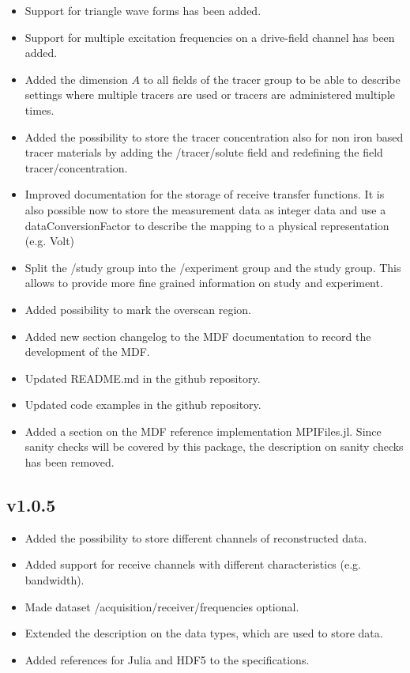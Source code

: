 \documentclass[landscape,a4paper]{article} %
\newcommand{\inlvar}[1]{{\ttfamily#1}}
\begin{document}
\begin{multicols}{2}
\begin{itemize}
	\item Support for triangle wave forms has been added.
	\item Support for multiple excitation frequencies on a drive-field channel has been added.
	\item Added the dimension $A$ to all fields of the \inlvar{tracer} group to be able to describe settings where multiple tracers are used or tracers are administered multiple times.
	\item Added the possibility to store the tracer concentration also for non iron based tracer materials by adding the \inlvar{/tracer/solute} field and redefining the field \inlvar{tracer/concentration}.
 	\item Improved documentation for the storage of receive transfer functions. It is also possible now to store the measurement data as integer data and use a \inlvar{dataConversionFactor} to describe the mapping to a physical representation (e.g. Volt)
	\item Split the \inlvar{/study} group into the \inlvar{/experiment} group and the study group. This allows to provide more fine grained information on study and experiment.
	\item Added possibility to mark the overscan region.
	\item Added new section changelog to the MDF documentation to record the development of the MDF.
	\item Updated \inlvar{README.md} in the github repository.
	\item Updated code examples in the github repository.
	\item Added a section on the MDF reference implementation MPIFiles.jl. Since sanity checks will be covered by this package, the description on sanity checks has been removed.
\end{itemize}


\subsection{v1.0.5}

\begin{itemize}
	\item Added the possibility to store different channels of reconstructed data.
	\item Added support for receive channels with different characteristics (e.g. bandwidth).
	\item Made dataset \inlvar{/acquisition/receiver/frequencies} optional.
	\item Extended the description on the data types, which are used to store data.
	\item Added references for Julia and HDF5 to the specifications.
\end{itemize}



\end{multicols}
\end{document}
